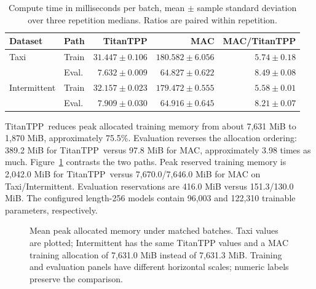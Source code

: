 \documentclass[runningheads]{llncs}
\providecommand{\Description}[1]{}
\newcommand{\method}{TitanTPP}
\begin{document}
\begin{table}[t]
\caption{Compute time in milliseconds per batch, mean $\pm$ sample
standard deviation over three repetition medians. Ratios are paired within
repetition.}
\label{tab:cost}\centering\small
\begin{tabular}{llrrr}
\toprule
Dataset & Path & TitanTPP & MAC & MAC/TitanTPP\\
\midrule
Taxi & Train & $31.447\pm0.106$ & $180.582\pm6.056$ & $5.74\pm0.18$\\
 & Eval. & $7.632\pm0.009$ & $64.827\pm0.622$ & $8.49\pm0.08$\\
Intermittent & Train & $32.157\pm0.023$ & $179.472\pm0.555$ & $5.58\pm0.01$\\
 & Eval. & $7.909\pm0.030$ & $64.916\pm0.645$ & $8.21\pm0.07$\\
\bottomrule
\end{tabular}
\end{table}

\method\ reduces peak allocated training memory from about 7,631 MiB to
1,870 MiB, approximately 75.5\%. Evaluation reverses the allocation ordering:
389.2 MiB for \method\ versus 97.8 MiB for MAC, approximately 3.98 times
as much. Figure~\ref{fig:memory} contrasts the two paths.
Peak reserved training memory is 2,042.0 MiB for \method\ versus
7,670.0/7,646.0 MiB for MAC on Taxi/Intermittent. Evaluation reservations
are 416.0 MiB versus 151.3/130.0 MiB. The configured length-256 models
contain 96,003 and 122,310 trainable parameters, respectively.

\begin{figure}[t]
\centering
{}
\Description{Two paired horizontal bar panels compare allocated GPU memory.
Training uses about 7631 MiB for MAC and 1870 MiB for TitanTPP. Evaluation
uses 97.8 MiB for MAC and 389.2 MiB for TitanTPP. The evaluation panel has an
expanded scale and all bars carry numeric labels.}
\caption{Mean peak allocated memory under matched batches. Taxi values
are plotted; Intermittent has the same TitanTPP values and a MAC training
allocation of 7,631.0 MiB instead of 7,631.3 MiB. Training and evaluation
panels have different horizontal scales; numeric labels preserve the
comparison.}
\label{fig:memory}
\end{figure}
\end{document}
